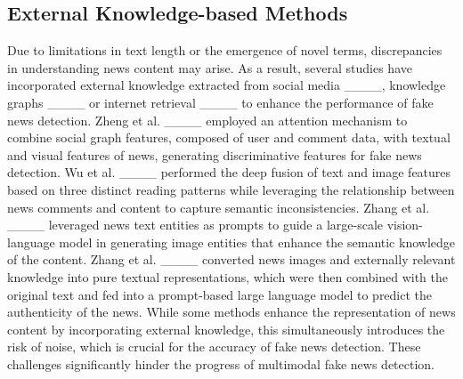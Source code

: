 \subsection{External Knowledge-based Methods}
Due to limitations in text length or the emergence of novel terms, discrepancies in understanding news content may arise. As a result, several studies have incorporated external knowledge extracted from social media ____, knowledge graphs ____ or internet retrieval ____ to enhance the performance of fake news detection. Zheng et al. ____ employed an attention mechanism to combine social graph features, composed of user and comment data, with textual and visual features of news, generating discriminative features for fake news detection. Wu et al. ____ performed the deep fusion of text and image features based on three distinct reading patterns while leveraging the relationship between news comments and content to capture semantic inconsistencies. Zhang et al. ____ leveraged news text entities as prompts to guide a large-scale vision-language model in generating image entities that enhance the semantic knowledge of the content. Zhang et al. ____ converted news images and externally relevant knowledge into pure textual representations, which were then combined with the original text and fed into a prompt-based large language model to predict the authenticity of the news. While some methods enhance the representation of news content by incorporating external knowledge, this simultaneously introduces the risk of noise, which is crucial for the accuracy of fake news detection. These challenges significantly hinder the progress of multimodal fake news detection.



    
%